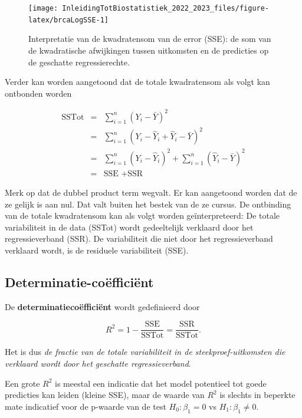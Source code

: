 \documentclass[
  12pt,dutch,coursenotes]{book}
\begin{document}
\begin{figure}

{\centering \texttt{[image: InleidingTotBiostatistiek\_2022\_2023\_files/figure-latex/brcaLogSSE-1]} 

}

\caption{Interpretatie van de kwadratensom van de error (SSE): de som van de kwadratische afwijkingen tussen uitkomsten en de predicties op de geschatte regressierechte.}\label{fig:brcaLogSSE}
\end{figure}

Verder kan worden aangetoond dat de totale kwadratensom als volgt kan ontbonden worden

\begin{eqnarray*}
  \text{SSTot}
    &=&  \sum_{i=1}^n (Y_i-\bar{Y})^2 \\
    &=&  \sum_{i=1}^n (Y_i-\hat{Y}_i+\hat{Y}_i-\bar{Y})^2 \\
    &=&  \sum_{i=1}^n (Y_i-\hat{Y}_i)^2+\sum_{i=1}^n(\hat{Y}_i-\bar{Y})^2 \\
    &=&  \text{SSE }+\text{SSR}  
\end{eqnarray*}

Merk op dat de dubbel product term wegvalt. Er kan aangetoond worden dat de ze gelijk is aan nul. Dat valt buiten het bestek van de ze cursus.
De ontbinding van de totale kwadratensom kan als volgt worden geïnterpreteerd:
De totale variabiliteit in de data (SSTot) wordt gedeeltelijk verklaard door het regressieverband (SSR). De variabiliteit die niet door het regressieverband verklaard wordt, is de residuele variabiliteit (SSE).

\hypertarget{determinatie-couxebfficiuxebnt}{%
\subsection{Determinatie-coëfficiënt}\label{determinatie-couxebfficiuxebnt}}

De \textbf{determinatiecoëfficiënt} wordt gedefinieerd door

\[ R^2 = 1-\frac{\text{SSE}}{\text{SSTot}}=\frac{\text{SSR}}{\text{SSTot}}.\]

Het is dus \emph{de fractie van de totale variabiliteit in de steekproef-uitkomsten die verklaard wordt door het geschatte regressieverband}.

Een grote \(R^2\) is meestal een indicatie dat het model potentieel tot goede predicties kan leiden (kleine SSE), maar de waarde van \(R^2\) is slechts in beperkte mate indicatief voor de p-waarde van de test \(H_0:\beta_1=0\) vs \(H_1:\beta_1\neq0\).
\end{document}
